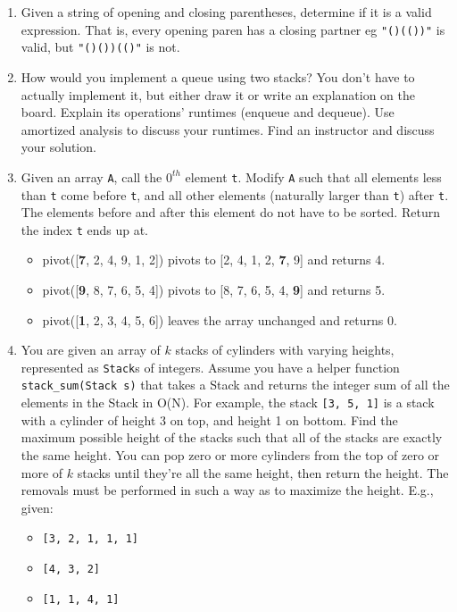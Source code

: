 \documentclass{article}
\begin{document}
\begin{enumerate}


\item Given a string of opening and closing parentheses, determine if it is a valid expression. That is, every opening paren has a closing partner eg \texttt{"()(())"} is valid, but \texttt{"()())(()"} is not.

\item How would you implement a queue using two stacks? You don’t have to actually implement it, but either draw it or write an explanation on the board. Explain its operations’ runtimes (enqueue and dequeue). Use amortized analysis to discuss your runtimes. Find an instructor and discuss your solution.

\item Given an array \texttt{A}, call the $0^{th}$ element \texttt{t}. Modify \texttt{A} such that all elements less than \texttt{t} come before \texttt{t}, and all other elements (naturally larger than \texttt{t}) after \texttt{t}. The elements before and after this element do not have to be sorted. Return the index \texttt{t} ends up at.%

\begin{itemize}
  \item pivot([\textbf{7}, 2, 4, 9, 1, 2]) pivots to [2, 4, 1, 2, \textbf{7}, 9] and returns 4.
  \item pivot([\textbf{9}, 8, 7, 6, 5, 4]) pivots to [8, 7, 6, 5, 4, \textbf{9}] and returns 5.
  \item pivot([\textbf{1}, 2, 3, 4, 5, 6]) leaves the array unchanged and returns 0.
\end{itemize}

\item You are given an array of $k$ stacks of cylinders with varying heights, represented as \texttt{Stack}s of integers. Assume you have a helper function \texttt{stack\_sum(Stack s)} that takes a Stack and returns the integer sum of all the elements in the Stack in O(N).  For example, the stack \texttt{[3, 5, 1]} is a stack with a cylinder of height 3 on top, and height 1 on bottom. Find the maximum possible height of the stacks such that all of the stacks are exactly the same height. You can pop zero or more cylinders from the top of zero or more of $k$ stacks until they're all the same height, then return the height. The removals must be performed in such a way as to maximize the height. E.g., given:

\begin{itemize}
  \item \texttt{[3, 2, 1, 1, 1]}
  \item \texttt{[4, 3, 2]}
  \item \texttt{[1, 1, 4, 1]}
\end{itemize}


\end{enumerate}
\end{document}
